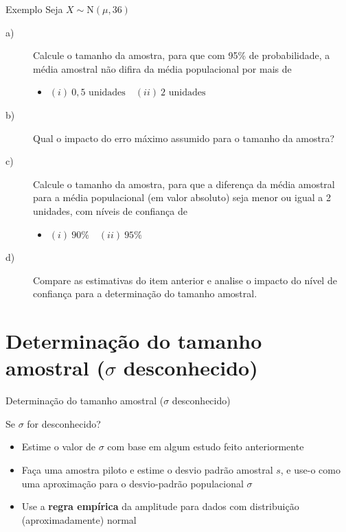 \documentclass[14pt,aspectratio=1610]{beamer}
\begin{document}
\begin{frame}{}
    \begin{block}{Exemplo}
    \justifying
Seja $X \sim \text{N}(\mu,36)$
\begin{description}
\item[a)~]Calcule o tamanho da amostra, para que com 95\% de probabilidade, a média amostral não difira da média populacional por mais de 
   \begin{itemize}
       \item $(i)\ 0,5 \text{ unidades} \quad (ii)\ 2 \text{ unidades}$
   \end{itemize}
\item[b)~]Qual o impacto do erro máximo assumido para o tamanho da amostra?
\item[c)~]Calcule o tamanho da amostra, para que a diferença da média amostral para a média populacional (em valor absoluto) seja menor ou igual a 2 unidades, com níveis de confiança de
\begin{itemize}
    \item $(i)\ 90\% \quad (ii)\ 95\%$
\end{itemize}
\item[d)~] Compare as estimativas do item anterior e analise o impacto do nível de confiança para a determinação do tamanho amostral.
\end{description}
\end{block}
\end{frame}

\section{Determinação do tamanho amostral ($\sigma$ desconhecido)}
\begin{frame}{Determinação do tamanho amostral ($\sigma$ desconhecido)}
    \begin{block}{}
    \justifying
Se $\sigma$ for desconhecido?
\begin{itemize}
    \item Estime o valor de $\sigma$ com base em algum estudo feito anteriormente
    \item Faça uma amostra piloto e estime o desvio padrão amostral $s$, e use-o como uma aproximação para o desvio-padrão populacional $\sigma$
    \item Use a \textbf{regra empírica} da amplitude para dados com distribuição (aproximadamente) normal
\end{itemize}
\end{block}
\end{frame}
\end{document}

